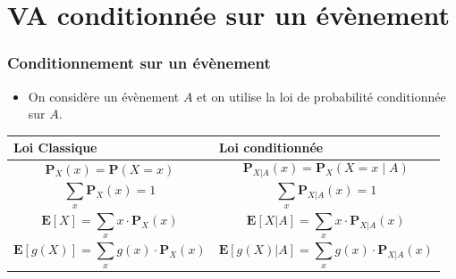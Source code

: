 \documentclass{beamer}
\renewcommand{\P}{\mathbf{P}}
\newcommand{\E}{\mathbf{E}}
\begin{document}
\section{VA conditionnée sur un évènement}
\begin{frame}[t]
  \frametitle{Conditionnement sur un évènement}
  \begin{itemize}
    \small
    \item On considère un évènement $A$ et on utilise la loi de \alert{probabilité
      conditionnée sur $A$}.
  \end{itemize}
  \centering
  \scriptsize
  \vspace*{1cm}
  \begin{tabular}{m{5cm}m{5cm}}
   \toprule 
   \textbf{Loi Classique} & \textbf{Loi conditionnée}\\[8pt]
   \midrule
   $$ \P_X(x) = \P(X = x)$$ &  $$\P_{X|A}(x) = \P_X( X = x\;|\; A)$$ \\[3pt]
   $$ \sum_x\P_X(x) = 1$$ &  $$\sum_x\P_{X|A}(x) = 1$$ \\[3pt]
   $$ \E[X] = \sum_x x\cdot\P_X(x)  $$ &  $$\E[X|A] = \sum_x x\cdot\P_{X|A}(x)$$ \\[3pt]
   $$ \E[g(X)] = \sum_x g(x)\cdot\P_X(x)  $$ &  $$\E[g(X)|A] = \sum_x g(x)\cdot\P_{X|A}(x)$$ \\[4pt]
   \bottomrule
\end{tabular}
\end{frame}
\end{document}
